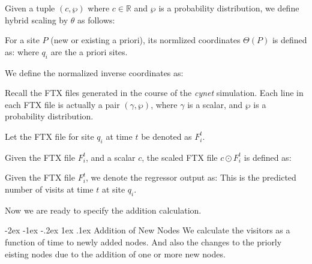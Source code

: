 \documentclass[onecolumn, compsoc,10pt]{IEEEtran}
\makeatletter
\renewcommand\section{\@startsection {section}{1}{\z@}%
  {-2ex \@plus -1ex \@minus -.2ex}%
  {1ex \@plus.1ex}%
  {\LARGE\bfseries\scshape}}
\makeatother
\begin{document}
\begin{defn}
Given a tuple $(c,\wp)$ where $c \in \mathbb{R}$ and $\wp$ is a probability distribution, we define hybrid scaling by $\theta$ as follows:
\end{defn}

\begin{defn}
For a  site $P$ (new or existing a priori), its normlized coordinates $\Theta(P)$ is defined as:
where $q_i$ are the a priori sites.
\end{defn}

\begin{defn}
We define the normalized inverse coordinates as:
\end{defn}

Recall the FTX files generated in the course of the \textit{cynet} simulation.
Each line in each FTX file is actually a pair $(\gamma,\wp)$, where $\gamma$ is a scalar, and $\wp $ is a probability distribution.

\begin{notn}
Let the FTX file for site $q_i$ at time $t$ be denoted as $F_i^t$.
\end{notn}

\begin{defn}
Given the FTX file $F_i^t$, and a scalar $c$, the scaled FTX file $c \odot F_i^t$ is defined as:
\end{defn}
\begin{notn}
Given the FTX file $F_i^t$, we denote the regressor output as:
This is the predicted number of visits at time $t$ at site $q_i$.
\end{notn}

Now we are ready to specify the addition calculation. 

\section{Addition of New Nodes}
We calculate the visitors as a function of time to newly added nodes. And also the changes to the priorly eisting nodes due to the addition of one or more new nodes.
\end{document}
